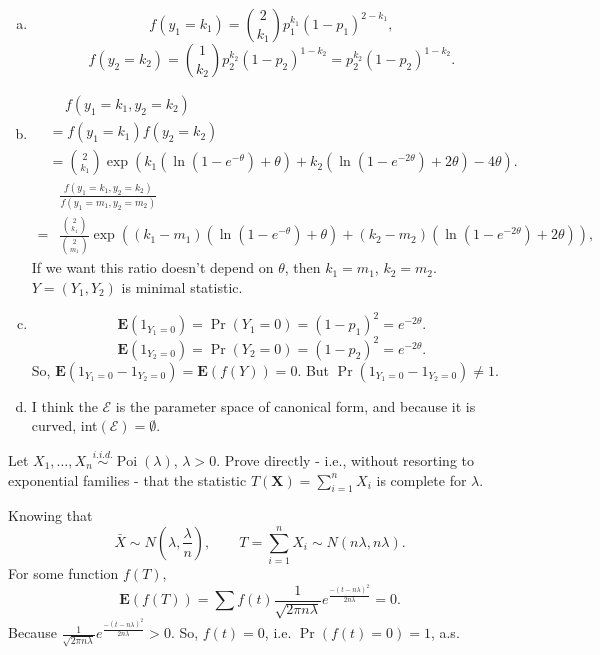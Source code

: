 \begin{solution}
    \begin{enumerate}[(a)]
        \item \[f(y_1=k_1)=\binom{2}{k_1}p_1^{k_1}(1-p_1)^{2-k_1}, \]
        \[f(y_2=k_2)=\binom{1}{k_2}p_2^{k_2}(1-p_2)^{1-k_2}=p_2^{k_2}(1-p_2)^{1-k_2}. \]
        \item \[
            \begin{aligned}
                &\quad\, f(y_1=k_1, y_2=k_2)\\
                &=f(y_1=k_1)f(y_2=k_2)\\
                &=\binom{2}{k_1}\exp\left(k_1\left(\ln\left(1-e^{-\theta}\right)+\theta\right)+k_2\left(\ln\left(1-e^{-2\theta}\right)+2\theta\right)-4\theta\right). 
            \end{aligned}
        \]
        \[
            \begin{aligned}
                &\frac{f(y_1=k_1, y_2=k_2)}{f(y_1=m_1, y_2=m_2)}\\
                ={}&{}\frac{\binom{2}{k_1}}{\binom{2}{m_1}}\exp\left((k_1-m_1)\left(\ln\left(1-e^{-\theta}\right)+\theta\right)+(k_2-m_2)\left(\ln\left(1-e^{-2\theta}\right)+2\theta\right)\right), 
            \end{aligned}
        \]
        If we want this ratio doesn't depend on $\theta$, then $k_1=m_1$, $k_2=m_2$. $Y=(Y_1,Y_2)$ is minimal statistic. 
        \item \[
            \mathbf{E}(1_{Y_1=0})=\Pr(Y_1=0)=(1-p_1)^2=e^{-2\theta}. 
        \]
        \[
            \mathbf{E}(1_{Y_2=0})=\Pr(Y_2=0)=(1-p_2)^2=e^{-2\theta}. 
        \]
        So, $\mathbf{E}(1_{Y_1=0}-1_{Y_2=0})=\mathbf{E}(f(Y))=0$. But $\Pr(1_{Y_1=0}-1_{Y_2=0})\neq 1$. 
        \item I think the $\mathcal{E}$ is the parameter space of canonical form, and because it is curved, int$(\mathcal{E})=\emptyset$. 
    \end{enumerate}
\end{solution}

\begin{exercise}
    Let \(X_{1}, \ldots, X_{n} \stackrel{i.i.d. }{\sim} \operatorname{Poi}(\lambda)\), \(\lambda>0\). Prove directly - i.e., without resorting to exponential families - that the statistic \(T(\mathbf{X})=\sum_{i=1}^{n} X_{i}\) is complete for \(\lambda\). 
\end{exercise}

\begin{solution}
    Knowing that  
    \[
        \bar{X}\sim N\left(\lambda, \frac{\lambda}{n}\right), \qquad T=\sum_{i=1}^nX_i\sim N\left(n\lambda, n\lambda\right). 
    \]
    For some function $f(T)$, 
    \[
        \mathbf{E}(f(T))=\sum f(t)\frac{1}{\sqrt{2\pi n\lambda}}e^\frac{-(t-n\lambda)^2}{2n\lambda}=0. 
    \]
    Because $\frac{1}{\sqrt{2\pi n\lambda}}e^\frac{-(t-n\lambda)^2}{2n\lambda}>0$. So, $f(t)=0$, i.e. $\Pr(f(t)=0)=1$, a.s. 
\end{solution}

